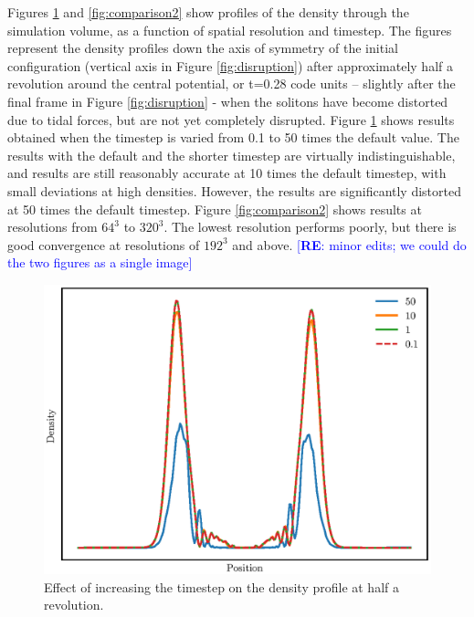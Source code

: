 \documentclass[a4paper,11pt]{article}
\newcommand{\re}[1]{\textcolor{blue}{[{\bf RE}: #1]}}
\begin{document}
Figures \ref{fig:comparison} and \ref{fig:comparison2} show profiles of the density through the simulation volume, as a function of spatial resolution and timestep.  The figures represent the density profiles down the axis of symmetry of the initial configuration (vertical axis in Figure \ref{fig:disruption}) after approximately half a revolution around the central potential, or t=0.28 code units -- slightly after the final frame in Figure \ref{fig:disruption} - when the solitons have become distorted due to tidal forces, but are not yet completely disrupted. Figure \ref{fig:comparison} shows results obtained when the timestep is varied from 0.1 to 50 times the default value. The results with the default and the shorter timestep are virtually indistinguishable, and results are still reasonably accurate at 10 times the default timestep, with small deviations at high densities. However, the results are significantly distorted at 50 times the default timestep. Figure \ref{fig:comparison2} shows results at resolutions from $64^3$ to $320^3$. The lowest resolution performs poorly, but there is good convergence  at resolutions of $192^3$ and above. \re{minor edits; we could do the two figures as a single image}

\begin{figure}
  \includegraphics[width=1.\textwidth,trim=0 0.8cm 0 1.2cm,clip]{comparison}
  \caption{Effect of increasing the timestep on the density profile at half a revolution.}
  \label{fig:comparison}
\end{figure}
\end{document}
